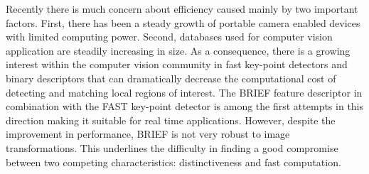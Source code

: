 \documentclass[letterpaper, 10pt, conference]{ieeeconf}
\begin{document}
Recently there is much concern about efficiency caused mainly by two important factors. First, there has been a steady growth of portable camera enabled devices with limited computing power. Second, databases used for computer vision application are steadily increasing in size. As a consequence, there is a growing interest within the computer vision community in fast key-point detectors and binary descriptors that can dramatically decrease the computational cost of detecting and matching local regions of interest. The BRIEF \cite{calonder10} feature descriptor in combination with the FAST \cite{rosten06} key-point detector is among the first attempts in this direction making it suitable for real time applications. However, despite the improvement in performance, BRIEF is not very robust to image transformations. This underlines the difficulty in finding a good compromise between two competing characteristics: distinctiveness and fast computation. 
\end{document}
